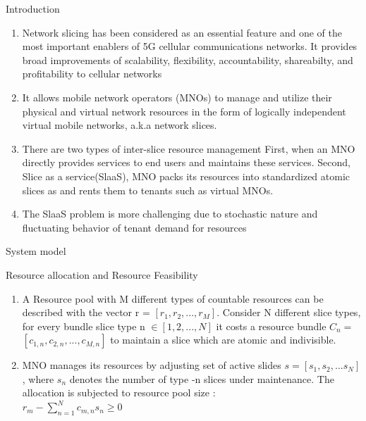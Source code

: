 \documentclass{beamer}
\begin{document}
\begin{frame}{Introduction}
\begin{enumerate}
    \item Network slicing has been considered as an essential feature and one of the most important enablers of 5G cellular communications networks. It provides broad improvements of scalability, flexibility, accountability, shareabilty, and profitability to cellular networks 
    \item It allows mobile network operators (MNOs) to manage and utilize their physical and virtual network resources in the form of logically independent virtual mobile networks, a.k.a network slices.
    \item There are two types of inter-slice resource management First, when an MNO directly provides services to end users and maintains these services. Second, Slice as a service(SlaaS), MNO packs its resources into standardized atomic slices as and rents them to tenants such as virtual MNOs. 
    \item The SlaaS problem is more challenging due to stochastic nature and fluctuating behavior of tenant demand for resources 
\end{enumerate}
\end{frame}
\begin{frame}{System model}
\begin{block}{Resource allocation and Resource Feasibility}
\begin{enumerate}
    \item A Resource pool with M different types of countable resources can be described with the vector r = $[r_{1},r_{2},...,r_{M}]$. Consider N different slice types, for every bundle slice type n $\in[1,2,...,N]$ it costs a resource bundle $C_{n} =$ $[c_{1,n},c_{2,n},...,c_{M,n}]$ to maintain a slice which are atomic and indivisible.
    \item MNO manages its resources by adjusting set of active slides $s = [s_{1},s_{2},...s_{N}]$, where $s_{n}$  denotes the number of type -n slices under maintenance. The allocation is subjected to resource pool size :\\
    $r_{m}-\sum_{n=1}^{N}c_{m,n}s_{n}\geq 0$
\end{enumerate}
\end{block}
\end{frame}
\end{document}

